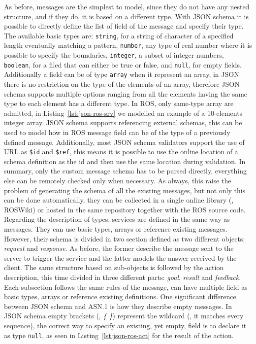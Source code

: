 As before, messages are the simplest to model, since they do not have any nested structure, and if they do, it is based on a different type. With JSON schema it is possible to directly define the list of field of the message and specify their type. The available basic types are: \texttt{string}, for a string of character of a specified length eventually matching a pattern, \texttt{number}, any type of real number where it is possible to specify the boundaries, \texttt{integer}, a subset of integer numbers, \texttt{boolean}, for a filed that can either be true or false, and \texttt{null}, for empty fields. Additionally a field can be of type \texttt{array} when it represent an array, in JSON there is no restriction on the type of the elements of an array, therefore JSON schema supports multiple options ranging from all the elements having the same type to each element has a different type. In ROS, only same-type array are admitted, in Listing~\ref{lst:json-ros-srv} we modelled an example of a 10-elements integer array. JSON schema supports referencing external schemas, this can be used to model how in ROS message field can be of the type of a previously defined message. Additionally, most JSON schema validators support the use of URL as \texttt{\$id} and \texttt{\$ref}, this means it is possible to use the online location of a schema definition as the id and then use the same location during validation. In summary, only the custom message schema has to be parsed directly, everything else can be remotely checked only when necessary. As always, this raise the problem of generating the schema of all the existing messages, but not only this can be done automatically, they can be collected in a single online library (\eg, ROSWiki) or hosted in the same repository together with the ROS source code. Regarding the description of types, services are defined in the same way as messages. They can use basic types, arrays or reference existing messages. However, their schema is divided in two section defined as two different objects: \textit{request} and \textit{response}. As before, the former describe the message sent to the server to trigger the service and the latter models the answer received by the client. The same structure based on sub-objects is followed by the action description, this time divided in three different parts: \textit{goal}, \textit{result} and \textit{feedback}. Each subsection follows the same rules of the message, can have multiple field as basic types, arrays or reference existing definitions. One significant difference between JSON schema and ASN.1 is how they describe empty messages. In JSON schema empty brackets (\ie, \textit{\{ \}}) represent the wildcard (\ie, it matches every sequence), the correct way to specify an existing, yet empty, field is to declare it as type \texttt{null}, as seen in Listing~\ref{lst:json-ros-act} for the result of the action.

